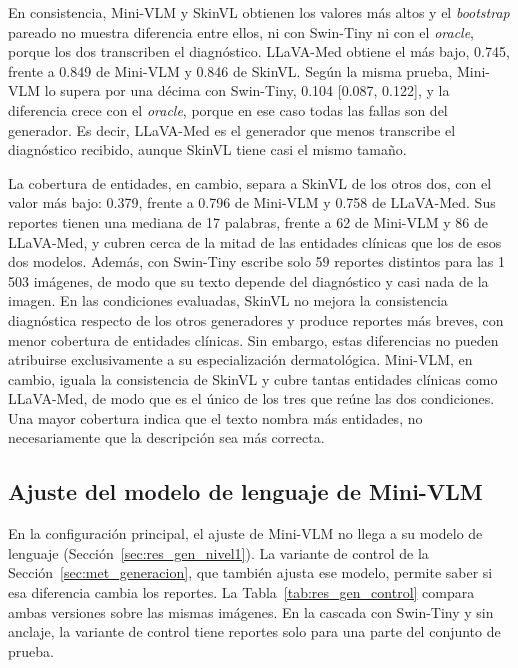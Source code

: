 En consistencia, Mini-VLM y SkinVL obtienen los valores más altos y el \emph{bootstrap} pareado no muestra diferencia entre ellos, ni con Swin-Tiny ni con el \emph{oracle}, porque los dos transcriben el diagnóstico. LLaVA-Med obtiene el más bajo, 0.745, frente a 0.849 de Mini-VLM y 0.846 de SkinVL. Según la misma prueba, Mini-VLM lo supera por una décima
con Swin-Tiny, 0.104 [0.087, 0.122], y la diferencia crece con el \emph{oracle}, porque en ese caso todas las fallas
son del generador. Es decir, LLaVA-Med es el generador que menos transcribe el diagnóstico recibido, aunque SkinVL tiene casi el mismo tamaño.

La cobertura de entidades, en cambio, separa a SkinVL de los otros dos, con el valor más bajo: 0.379, frente a 0.796 de Mini-VLM y 0.758 de LLaVA-Med. Sus reportes tienen una
mediana de 17 palabras, frente a 62 de Mini-VLM y 86 de LLaVA-Med, y cubren cerca de la mitad de las entidades clínicas que los de esos dos modelos.
Además, con Swin-Tiny escribe solo 59 reportes distintos para las 1\,503 imágenes, de modo que su texto depende del
diagnóstico y casi nada de la imagen. En las condiciones evaluadas, SkinVL no mejora la consistencia diagnóstica respecto de los otros generadores y produce reportes más breves, con menor cobertura de entidades clínicas. Sin embargo, estas diferencias no pueden atribuirse exclusivamente a su especialización dermatológica. Mini-VLM, en cambio, iguala la consistencia de SkinVL y cubre tantas entidades clínicas como LLaVA-Med, de modo que es
el único de los tres que reúne las dos condiciones. Una mayor cobertura indica que el texto nombra más entidades, no
necesariamente que la descripción sea más correcta.

\subsection{Ajuste del modelo de lenguaje de Mini-VLM}
\label{sec:res_gen_control_mini}

En la configuración principal, el ajuste de Mini-VLM no llega a su modelo de lenguaje
(Sección~\ref{sec:res_gen_nivel1}). La variante de control de la Sección~\ref{sec:met_generacion}, que también
ajusta ese modelo, permite saber si esa diferencia cambia los reportes. La Tabla~\ref{tab:res_gen_control} compara ambas versiones sobre las mismas imágenes. En la cascada con Swin-Tiny
y sin anclaje, la variante de control tiene reportes solo para una parte del conjunto de prueba.

